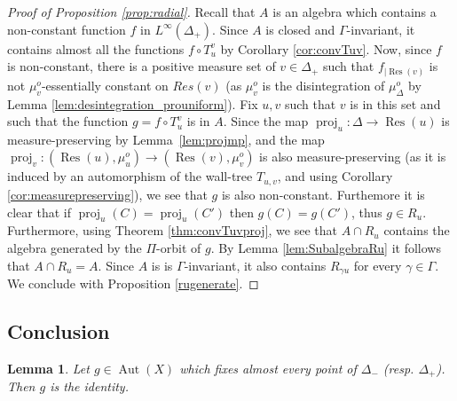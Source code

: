 \documentclass[a4paper, 11pt]{article}
\theoremstyle{plain}
\newtheorem{lemma}[proposition]{Lemma}
\theoremstyle{definition}
\theoremstyle{remark}
\DeclareMathOperator{\Aut}{Aut}
\DeclareMathOperator{\proj}{proj}
\DeclareMathOperator{\Res}{Res}
\begin{document}
\begin{proof}[Proof of Proposition \ref{prop:radial}]
Recall that $A$ is an algebra which contains a non-constant function $f$  in $L^\infty(\Delta_+)$. Since $A$ is closed and $\Gamma$-invariant, it contains almost all the functions $f\circ T_u^v$ by Corollary \ref{cor:convTuv}. Now, since $f$ is non-constant, there is a positive measure set of $v\in \Delta_+$ such that $f_{|\Res(v)}$ is not $\mu_v^o$-essentially constant on $Res(v)$ (as $\mu_v^o$ is the disintegration of $\mu_\Delta^o$ by Lemma \ref{lem:desintegration_prouniform}). Fix $u,v$ such that $v$ is in this set and such that the function $g=f\circ T_u^v$ is in $A$. Since the map $\proj_u:\Delta\to \Res(u)$ is measure-preserving by Lemma~\ref{lem:projmp}, and the map $\proj_v:(\Res(u),\mu_u^o)\to (\Res(v),\mu_v^o)$ is also measure-preserving (as it is induced by an automorphism of the wall-tree $T_{u,v}$, and using Corollary \ref{cor:measurepreserving}), we see that $g$ is also non-constant. Furthemore it is clear that if $\proj_u(C)=\proj_u(C')$ then $g(C)=g(C')$, thus $g\in R_u$.
 Furthermore, using Theorem \ref{thm:convTuvproj}, we see that $A\cap R_u$ contains the algebra generated  by the $\Pi$-orbit of $g$. By Lemma \ref{lem:SubalgebraRu} it follows that $A\cap R_u=A$. Since $A$ is is $\Gamma$-invariant, it also contains $R_{\gamma u}$ for every $\gamma\in \Gamma$. We conclude with Proposition \ref{rugenerate}.

\end{proof}


\subsection{Conclusion}

\begin{lemma}\label{lem:fixedpointae}
Let $g\in \Aut(X)$ which fixes almost every point of $\Delta_-$ (resp. $\Delta_+$). Then $g$ is the identity.
\end{lemma}
\end{document}
